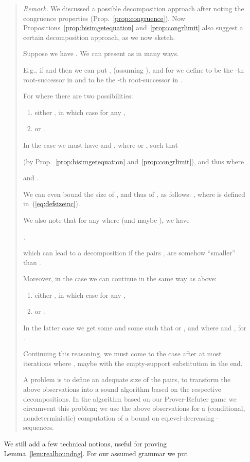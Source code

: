 \documentclass{llncs}
\begin{document}
\begin{quote}
	{\small
		\emph{Remark.}
We discussed a possible decomposition approach after noting the
congruence properties (Prop.~\ref{prop:congruence}). Now
		Propositions~\ref{prop:bisimgetequation}
		and~\ref{prop:congrlimit} also suggest a certain
decomposition approach, as we now sketch. 

Suppose we have . We can present  as
 in many ways. 

E.g., if  and
 then we can put , 
 (assuming ), and
for  we define  to be the -th
root-successor in 
and  to be the -th
root-successor in .

For  where  there
are
two possibilities:
\begin{enumerate}
	\item		
either , in which case  for any
,
	\item
or .
\end{enumerate}
In the case  we must have   and , where  or  , 
such that 
\begin{center}

\end{center}
(by Prop.~\ref{prop:bisimgetequation} and~\ref{prop:congrlimit}), and
thus  where
\begin{center}
 and .
\end{center}

We can even bound the size of , and thus of , as follows:
,
where  is defined in~(\ref{eq:defsizeinc}). 

We also note that for any  where 
(and maybe ), we have 
\begin{center}
,
\end{center}
which can lead to a decomposition if the pairs
,  are somehow
``smaller'' than .

Moreover, in the case   we can
continue in the same way as above:
\begin{enumerate}
	\item		
either , in which case  for any
,
	\item
or .
\end{enumerate}
In the latter case we get some  and some
 such that  or  , and 
 where
 and , for
.

Continuing this reasoning, we must come to the case  after at most
 iterations where , maybe with the
empty-support substitution in the end.

A problem is to define an adequate size of the pairs, to transform the above
observations into a sound algorithm based on the respective
decompositions. In the algorithm based on our Prover-Refuter game we
circumvent this problem; we use the above observations
for a (conditional, nondeterministic)
computation of a bound on eqlevel-decreasing -sequences.
	}		
\end{quote}	
We still add a few technical notions, useful for proving
Lemma~\ref{lem:realboundng}. For our assumed grammar
 we put 
	
\end{document}
